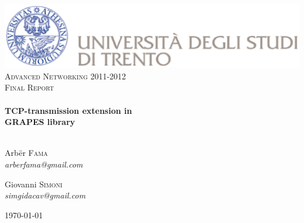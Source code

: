 \begin{titlepage}

\begin{center}

\includegraphics[scale=0.4]{figures/logo}\\[1cm]

\textsc{\large Advanced Networking 2011-2012}\\[1.5cm]

\textsc{\large Final Report}\\[0.5cm]

\HRule \\[0.5cm]
{\Large \bfseries TCP-transmission extension in\\ GRAPES library}\\[0.5cm]
\HRule \\[1.5cm]

\begin{minipage}{0.4\textwidth}
\begin{flushleft} \large
Arb\"er \textsc{Fama}\\
\emph{arberfama@gmail.com}
\end{flushleft}
\end{minipage}
\begin{minipage}{0.4\textwidth}
\begin{flushright} \large
Giovanni \textsc{Simoni} \\
\emph{simgidacav@gmail.com}
\end{flushright}
\end{minipage}

\vfill

{\large \today}

\end{center}

\end{titlepage}
